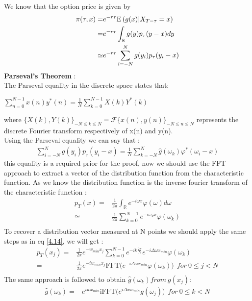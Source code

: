 \documentclass[12pt]{report}
\begin{document}
We know that the option price is given by 
\begin{align*}
\pi(\tau,x)= & e^{-r\tau} \mathrm{E} \left( {{g(x)|X_{T-\tau} = x}} \right)\\
\label{ff}
=& e^{-r\tau} \int_{\mathbb{R}}g(y)p_{\tau}(y-x)dy \\
\simeq  & e^{-r\tau} \sum_{i=-N}^{N}g(y_i)p_{\tau} (y_i-x)
\end{align*}
\textbf{Parseval's Theorem } : \\
The Parseval equality  in the discrete space states that: 
\begin{center}
\label{sum}
$\sum \limits_{n=0}^{N-1} x(n)y^*(n)= \frac{1}{N} \sum \limits_{k=0}^{N-1} X(k)Y^*(k)$
\end{center} 
where $\{X(k), Y(k)\}_{-N \leq k \leq N} = \mathcal{F} \{ x(n),y(n)\}_{-N \leq n \leq N} $ represents the discrete  Fourier transform respectively of x(n) and y(n).
\jcom{}\\

Using the Parseval equality we can say that :
\begin{align}
\sum_{i=-N}^{N}g(y_i)p_{\tau}(y_i-x)=\frac{1}{N}\sum_{k=-N}^{N}\hat {g}(\omega_k)\varphi^*(\omega_i-x)
\end{align}
this equality is a required prior for the proof, now we should use the FFT approach to extract a vector of the distribution function from the characteristic function.
As we know the distribution function is the inverse fourier transform of the characteristic function :
\begin{align*}
p_T(x)=&\frac{1}{2 \pi}\int_{\mathbb{R}}e^{-i \omega x } \varphi(\omega) d\omega\\
\simeq &\frac{1}{2 \pi}\sum_{k=0}^{N-1}e^{-i \omega_k x } \varphi(\omega_k) \\
\end{align*}
To recover a distribution vector measured at N points we should  apply the same steps as in eq \eqref{4.14}, we will get :
\begin{align}
p_T(x_j)=&\frac{1}{2 \pi} e^{- w_{min} x_j}\sum_{k=0}^{N-1} e^{- i k \frac{2 \pi}{N}} e^{-i \Delta\omega x_{min} } \varphi(\omega_k) \\
\nonumber
=&\frac{1}{2 \pi} e^{- iw_{min} x_j} \text{FFT}\big ( e^{-i \Delta\omega x_{min} } \varphi(\omega_k) \big) ~~for~ 0 \leqslant j < N\\
\label{denstrans}
\end{align}
The same approach is followed to obtain ${\hat g (\omega_k) } from ~g(x_j)$:
\begin{align*}
\hat g (\omega_k)=& e^{i w x_{min}} \text{iFFT}\big ( e^{i \Delta x w_{min} } g(\omega_j) \big) ~~for~ 0 \leqslant k < N\\
\end{align*}
\end{document}
